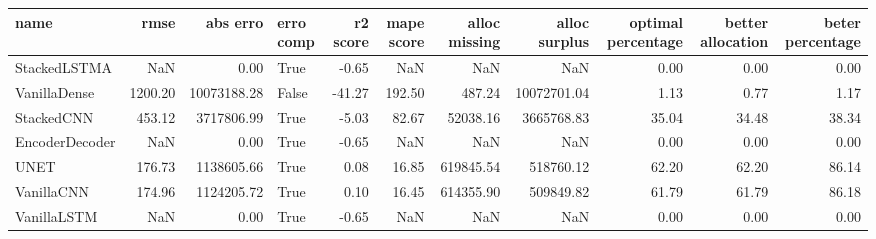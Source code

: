 \begin{tabular}{lrrlrrrrrrr}
\toprule
name & rmse & abs erro & erro comp & r2 score & mape score & alloc missing & alloc surplus & optimal percentage & better allocation & beter percentage \\
\midrule
StackedLSTMA & NaN & 0.00 & True & -0.65 & NaN & NaN & NaN & 0.00 & 0.00 & 0.00 \\
VanillaDense & 1200.20 & 10073188.28 & False & -41.27 & 192.50 & 487.24 & 10072701.04 & 1.13 & 0.77 & 1.17 \\
StackedCNN & 453.12 & 3717806.99 & True & -5.03 & 82.67 & 52038.16 & 3665768.83 & 35.04 & 34.48 & 38.34 \\
EncoderDecoder & NaN & 0.00 & True & -0.65 & NaN & NaN & NaN & 0.00 & 0.00 & 0.00 \\
UNET & 176.73 & 1138605.66 & True & 0.08 & 16.85 & 619845.54 & 518760.12 & 62.20 & 62.20 & 86.14 \\
VanillaCNN & 174.96 & 1124205.72 & True & 0.10 & 16.45 & 614355.90 & 509849.82 & 61.79 & 61.79 & 86.18 \\
VanillaLSTM & NaN & 0.00 & True & -0.65 & NaN & NaN & NaN & 0.00 & 0.00 & 0.00 \\
\bottomrule
\end{tabular}
